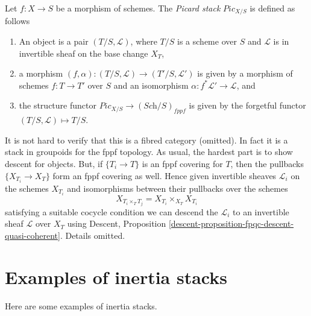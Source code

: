 \noindent
Let $f : X \to S$ be a morphism of schemes.
The {\it Picard stack} $\textit{Pic}_{X/S}$ is defined as follows
\begin{enumerate}
\item An object is a pair $(T/S, \mathcal{L})$, where $T/S$ is a
scheme over $S$ and $\mathcal{L}$ is in invertible sheaf on
the base change $X_T$,
\item a morphism $(f, \alpha) : (T/S, \mathcal{L}) \to (T'/S, \mathcal{L}')$
is given by a morphism of schemes $f : T \to T'$ over $S$ and an
isomorphism $\alpha : f^*\mathcal{L}' \to \mathcal{L}$, and
\item the structure functor $\textit{Pic}_{X/S} \to (\textit{Sch}/S)_{fppf}$
is given by the forgetful functor $(T/S, \mathcal{L}) \mapsto T/S$.
\end{enumerate}
It is not hard to verify that this is a fibred category (omitted).
In fact it is a stack in groupoids for the fppf topology.
As usual, the hardest part is to show descent for objects.
But, if $\{T_i \to T\}$ is an fppf covering for $T$, then the
pullbacks $\{X_{T_i} \to X_T\}$ form an fppf covering as well.
Hence given invertible sheaves $\mathcal{L}_i$ on the schemes
$X_{T_i}$ and isomorphisms between their pullbacks over the schemes
$$
X_{T_i \times_T T_j} = X_{T_i} \times_{X_T} X_{T_i}
$$
satisfying a suitable cocycle condition we can descend the
$\mathcal{L}_i$ to an invertible sheaf $\mathcal{L}$ over $X_T$ using
Descent, Proposition \ref{descent-proposition-fpqc-descent-quasi-coherent}. 
Details omitted.


\section{Examples of inertia stacks}
\label{section-examples-inertia}

\noindent
Here are some examples of inertia stacks.

